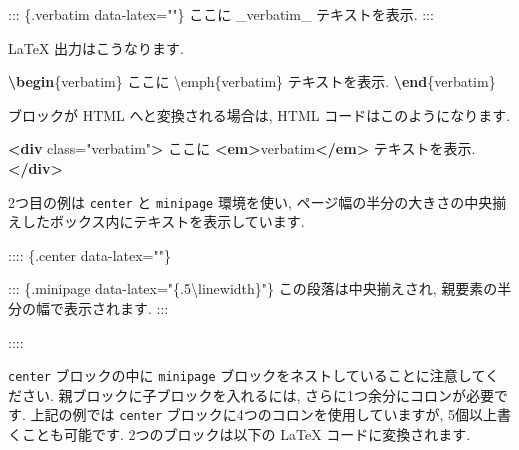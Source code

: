 \documentclass[
  11pt,
]{bxjsreport}
\newenvironment{Shaded}{\begin{snugshade}}{\end{snugshade}}
\newcommand{\ExtensionTok}[1]{#1}
\newcommand{\KeywordTok}[1]{\textcolor[rgb]{0.13,0.29,0.53}{\textbf{#1}}}
\newcommand{\NormalTok}[1]{#1}
\newcommand{\OtherTok}[1]{\textcolor[rgb]{0.56,0.35,0.01}{#1}}
\newcommand{\StringTok}[1]{\textcolor[rgb]{0.31,0.60,0.02}{#1}}
\newcommand{\VerbatimStringTok}[1]{\textcolor[rgb]{0.31,0.60,0.02}{#1}}
\begin{document}
\begin{Shaded}
\begin{Highlighting}[]
\NormalTok{::: \{.verbatim data{-}latex=""\}}
\NormalTok{ここに \_verbatim\_ テキストを表示.}
\NormalTok{:::}
\end{Highlighting}
\end{Shaded}

LaTeX 出力はこうなります.

\begin{Shaded}
\begin{Highlighting}[]
\KeywordTok{\textbackslash{}begin}\NormalTok{\{}\ExtensionTok{verbatim}\NormalTok{\}}
\VerbatimStringTok{ここに \textbackslash{}emph\{verbatim\} テキストを表示.}
\KeywordTok{\textbackslash{}end}\NormalTok{\{}\ExtensionTok{verbatim}\NormalTok{\}}
\end{Highlighting}
\end{Shaded}

ブロックが HTML へと変換される場合は, HTML コードはこのようになります.

\begin{Shaded}
\begin{Highlighting}[]
\KeywordTok{\textless{}div}\OtherTok{ class=}\StringTok{"verbatim"}\KeywordTok{\textgreater{}}
\NormalTok{ここに }\KeywordTok{\textless{}em\textgreater{}}\NormalTok{verbatim}\KeywordTok{\textless{}/em\textgreater{}}\NormalTok{ テキストを表示.}
\KeywordTok{\textless{}/div\textgreater{}}
\end{Highlighting}
\end{Shaded}

2つ目の例は \texttt{center} と \texttt{minipage} 環境を使い, ページ幅の半分の大きさの中央揃えしたボックス内にテキストを表示しています.

\begin{Shaded}
\begin{Highlighting}[]
\NormalTok{:::: \{.center data{-}latex=""\}}

\NormalTok{::: \{.minipage data{-}latex="\{.5\textbackslash{}linewidth\}"\}}
\NormalTok{この段落は中央揃えされ, 親要素の半分の幅で表示されます.}
\NormalTok{:::}

\NormalTok{::::}
\end{Highlighting}
\end{Shaded}

\texttt{center} ブロックの中に \texttt{minipage} ブロックをネストしていることに注意してください. 親ブロックに子ブロックを入れるには, さらに1つ余分にコロンが必要です. 上記の例では \texttt{center} ブロックに4つのコロンを使用していますが, 5個以上書くことも可能です. 2つのブロックは以下の LaTeX コードに変換されます.
\end{document}
